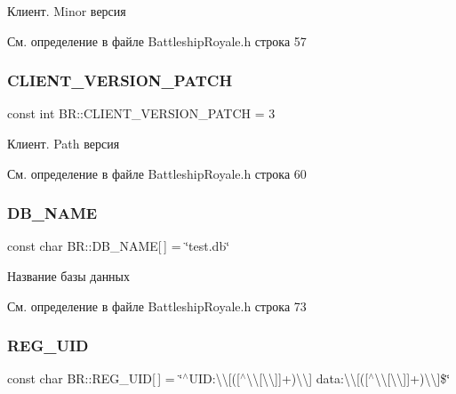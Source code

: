 Клиент. Minor версия 



См. определение в файле Battleship\+Royale.\+h строка 57

\mbox{\label{namespace_b_r_a35ec7e796e49c1a6b87e73c07d643378}} 
\subsubsection{\texorpdfstring{CLIENT\_VERSION\_PATCH}{CLIENT\_VERSION\_PATCH}}
{\footnotesize\ttfamily const int B\+R\+::\+C\+L\+I\+E\+N\+T\+\_\+\+V\+E\+R\+S\+I\+O\+N\+\_\+\+P\+A\+T\+CH = 3}



Клиент. Path версия 



См. определение в файле Battleship\+Royale.\+h строка 60

\mbox{\label{namespace_b_r_a30974fa6f1a17283bd60a3bb1e9501ff}} 
\subsubsection{\texorpdfstring{DB\_NAME}{DB\_NAME}}
{\footnotesize\ttfamily const char B\+R\+::\+D\+B\+\_\+\+N\+A\+ME\mbox{[}$\,$\mbox{]} = \char`\"{}test.\+db\char`\"{}}



Название базы данных 



См. определение в файле Battleship\+Royale.\+h строка 73

\mbox{\label{namespace_b_r_a6b288b2197101eea180f726c9ab3195a}} 
\subsubsection{\texorpdfstring{REG\_UID}{REG\_UID}}
{\footnotesize\ttfamily const char B\+R\+::\+R\+E\+G\+\_\+\+U\+ID\mbox{[}$\,$\mbox{]} = \char`\"{}$^\wedge$U\+I\+D\+:\textbackslash{}\textbackslash{}\mbox{[}(\mbox{[}$^\wedge$\textbackslash{}\textbackslash{}\mbox{[}\textbackslash{}\textbackslash{}\mbox{]}\mbox{]}+)\textbackslash{}\textbackslash{}\mbox{]} data\+:\textbackslash{}\textbackslash{}\mbox{[}(\mbox{[}$^\wedge$\textbackslash{}\textbackslash{}\mbox{[}\textbackslash{}\textbackslash{}\mbox{]}\mbox{]}+)\textbackslash{}\textbackslash{}\mbox{]}\$\char`\"{}}

